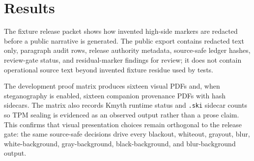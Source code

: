 \documentclass[
]{article}
\begin{document}
\newpage

\section{Results}\label{results}

The fixture release packet shows how invented high-side markers are
redacted before a public narrative is generated. The public export
contains redacted text only, paragraph audit rows, release authority
metadata, source-safe ledger hashes, review-gate status, and
residual-marker findings for review; it does not contain operational
source text beyond invented fixture residue used by tests.

The development proof matrix produces sixteen visual PDFs and, when
steganography is enabled, sixteen companion provenance PDFs with hash
sidecars. The matrix also records Kmyth runtime status and \texttt{.ski}
sidecar counts so TPM sealing is evidenced as an observed output rather
than a prose claim. This confirms that visual presentation choices
remain orthogonal to the release gate: the same source-safe decisions
drive every blackout, whiteout, grayout, blur, white-background,
gray-background, black-background, and blur-background output.



\clearpage


\end{document}
